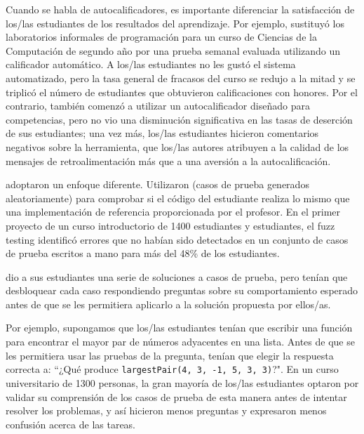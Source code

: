 Cuando se habla de autocalificadores, 
es importante diferenciar la satisfacción de los/las estudiantes de los resultados del aprendizaje.
Por ejemplo, 
\cite{Magu2018} sustituyó los laboratorios informales de programación para un curso de Ciencias de la Computación de segundo año por una prueba semanal evaluada utilizando un calificador automático.
A los/las estudiantes no les gustó el sistema automatizado, 
pero la tasa general de fracasos del curso se redujo a la mitad 
y se triplicó el número de estudiantes que obtuvieron calificaciones con honores.
Por el contrario, 
\cite{Rubi2014} también comenzó a utilizar un autocalificador diseñado para competencias, pero no vio una disminución significativa en las tasas de deserción de sus estudiantes;
una vez más, 
los/las estudiantes hicieron comentarios negativos sobre la herramienta, 
que los/las autores atribuyen a la calidad de los mensajes de retroalimentación más que a una aversión a la autocalificación.

\cite{Srid2016} adoptaron un enfoque diferente.
Utilizaron  
(casos de prueba generados aleatoriamente) 
para comprobar si el código del estudiante realiza lo mismo que una implementación de referencia proporcionada por el profesor.
En el primer proyecto de un curso introductorio de 1400 estudiantes y estudiantes, el fuzz testing identificó errores que no habían sido detectados en un conjunto de casos de prueba escritos a mano para más del 48\% de los estudiantes.

\cite{Basu2015} dio a sus estudiantes una serie de soluciones a casos de prueba, 
pero tenían que desbloquear cada caso respondiendo preguntas sobre su comportamiento esperado
antes de que se les permitiera aplicarlo a la solución propuesta por ellos/as.

Por ejemplo, 
supongamos que los/las estudiantes tenían que escribir una función para encontrar el mayor par de números adyacentes en una lista. Antes de que se les permitiera usar las pruebas de la pregunta, tenían que elegir la respuesta correcta a: ``¿Qué produce \texttt{largestPair(4, 3, -1, 5, 3, 3)}?".
En un curso universitario de 1300 personas, 
la gran mayoría de los/las estudiantes optaron por validar su comprensión de los casos de prueba de esta manera 
antes de intentar resolver los problemas, 
y así hicieron menos preguntas y expresaron menos confusión acerca de las tareas.

